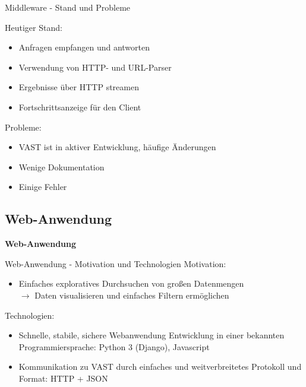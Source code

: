 \documentclass[9pt]{beamer}
\begin{document}
\begin{frame}{Middleware - Stand und Probleme}{}

	Heutiger Stand:
	\begin{itemize}
		\item Anfragen empfangen und antworten
		\item Verwendung von HTTP- und URL-Parser
		\item Ergebnisse über HTTP streamen
		\item Fortschrittsanzeige für den Client
	\end{itemize}

	Probleme:
	\begin{itemize}
		\item VAST ist in aktiver Entwicklung, häufige Änderungen
		\item Wenige Dokumentation
		\item Einige Fehler
	\end{itemize}
	
\end{frame}

\subsection{Web-Anwendung}

	\begin{frame}{}
		\begin{center}
			\LARGE \textbf{Web-Anwendung}
		\end{center}
	\end{frame}

\begin{frame}{Web-Anwendung - Motivation und Technologien}{}
	Motivation:
	\begin{itemize}
		\item Einfaches exploratives Durchsuchen von großen Datenmengen\\
			$\rightarrow$ Daten visualisieren und einfaches Filtern ermöglichen
	\end{itemize}
	Technologien:
	\begin{itemize}
		\item Schnelle, stabile, sichere Webanwendung Entwicklung in einer bekannten Programmiersprache:  Python 3 (Django), Javascript			
		\item Kommunikation zu VAST durch einfaches  und weitverbreitetes Protokoll und Format: HTTP + JSON
	\end{itemize}
\end{frame}
\end{document}
